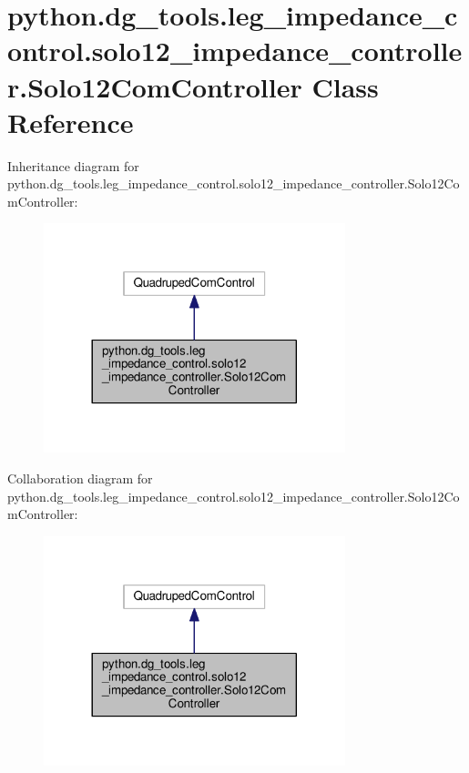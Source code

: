 \hypertarget{classpython_1_1dg__tools_1_1leg__impedance__control_1_1solo12__impedance__controller_1_1Solo12ComController}{}\section{python.\+dg\+\_\+tools.\+leg\+\_\+impedance\+\_\+control.\+solo12\+\_\+impedance\+\_\+controller.\+Solo12\+Com\+Controller Class Reference}
\label{classpython_1_1dg__tools_1_1leg__impedance__control_1_1solo12__impedance__controller_1_1Solo12ComController}


Inheritance diagram for python.\+dg\+\_\+tools.\+leg\+\_\+impedance\+\_\+control.\+solo12\+\_\+impedance\+\_\+controller.\+Solo12\+Com\+Controller\+:
\nopagebreak
\begin{figure}[H]
\begin{center}
\leavevmode
\includegraphics[width=248pt]{classpython_1_1dg__tools_1_1leg__impedance__control_1_1solo12__impedance__controller_1_1Solo12ComController__inherit__graph}
\end{center}
\end{figure}


Collaboration diagram for python.\+dg\+\_\+tools.\+leg\+\_\+impedance\+\_\+control.\+solo12\+\_\+impedance\+\_\+controller.\+Solo12\+Com\+Controller\+:
\nopagebreak
\begin{figure}[H]
\begin{center}
\leavevmode
\includegraphics[width=248pt]{classpython_1_1dg__tools_1_1leg__impedance__control_1_1solo12__impedance__controller_1_1Solo12ComController__coll__graph}
\end{center}
\end{figure}
